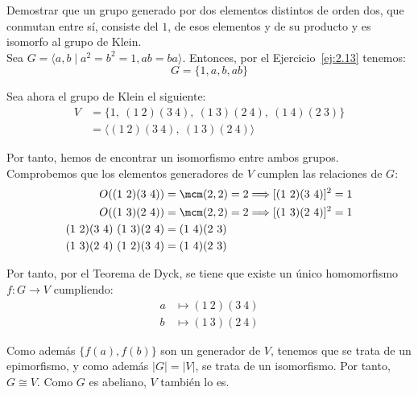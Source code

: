 \begin{ejercicio}\label{ej:2.32}
    Demostrar que un grupo generado por dos elementos distintos de orden dos, que conmutan entre sí, consiste del $1$, de esos elementos y de su producto y es isomorfo al grupo de Klein.\\

    Sea $G=\langle a,b\mid a^2=b^2=1, ab=ba\rangle$. Entonces, por el Ejercicio~\ref{ej:2.13} tenemos:
    \begin{equation*}
        G=\{1,a,b,ab\}
    \end{equation*}

    Sea ahora el grupo de Klein el siguiente:
    \begin{align*}
        V&=\{1,\ (1\ 2)(3\ 4),\ (1\ 3)(2\ 4),\ (1\ 4)(2\ 3)\}\\
        &= \langle (1\ 2)(3\ 4),\ (1\ 3)(2\ 4) \rangle
    \end{align*}

    Por tanto, hemos de encontrar un isomorfismo entre ambos grupos. Comprobemos que los elementos generadores de $V$ cumplen las relaciones de $G$:
    \begin{align*}
        O((1\ 2)(3\ 4))&= \mcm(2,2)=2\Longrightarrow [(1\ 2)(3\ 4)]^2=1\\
        O((1\ 3)(2\ 4))&= \mcm(2,2)=2\Longrightarrow [(1\ 3)(2\ 4)]^2=1\\
        (1\ 2)(3\ 4)\ (1\ 3)(2\ 4)&=(1\ 4)(2\ 3)\\
        (1\ 3)(2\ 4)\ (1\ 2)(3\ 4)&=(1\ 4)(2\ 3)
    \end{align*}

    Por tanto, por el Teorema de Dyck, se tiene que existe un único homomorfismo $f:G\to V$ cumpliendo:
    \begin{align*}
        a &\mapsto (1\ 2)(3\ 4)\\
        b &\mapsto (1\ 3)(2\ 4)
    \end{align*}

    Como además $\{f(a),f(b)\}$ son un generador de $V$, tenemos que se trata de un epimorfismo, y como además $|G|=|V|$, se trata de un isomorfismo. Por tanto, $G\cong V$. Como $G$ es abeliano, $V$ también lo es.
\end{ejercicio}

